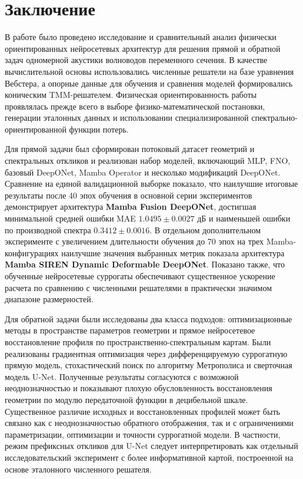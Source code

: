 \chapter*{Заключение}

В работе было проведено исследование и сравнительный анализ физически ориентированных нейросетевых архитектур для решения прямой и обратной задач одномерной акустики волноводов переменного сечения. В качестве вычислительной основы использовались численные решатели на базе уравнения Вебстера, а опорные данные для обучения и сравнения моделей формировались коническим TMM-решателем. Физическая ориентированность работы проявлялась прежде всего в выборе физико-математической постановки, генерации эталонных данных и использовании специализированной спектрально-ориентированной функции потерь.

Для прямой задачи был сформирован потоковый датасет геометрий и спектральных откликов и реализован набор моделей, включающий MLP, FNO, базовый DeepONet, Mamba Operator и несколько модификаций DeepONet. Сравнение на единой валидационной выборке показало, что наилучшие итоговые результаты после 40 эпох обучения в основной серии экспериментов демонстрирует архитектура \textbf{Mamba Fusion DeepONet}, достигшая минимальной средней ошибки MAE $1.0495 \pm 0.0027$ дБ и наименьшей ошибки по производной спектра $0.3412 \pm 0.0016$. В отдельном дополнительном эксперименте с увеличением длительности обучения до 70 эпох на трех Mamba-конфигурациях наилучшие значения выбранных метрик показала архитектура \textbf{Mamba SIREN Dynamic Deformable DeepONet}. Показано также, что обученные нейросетевые суррогаты обеспечивают существенное ускорение расчета по сравнению с численными решателями в практически значимом диапазоне размерностей.

Для обратной задачи были исследованы два класса подходов: оптимизационные методы в пространстве параметров геометрии и прямое нейросетевое восстановление профиля по пространственно-спектральным картам. Были реализованы градиентная оптимизация через дифференцируемую суррогатную прямую модель, стохастический поиск по алгоритму Метрополиса и сверточная модель U-Net. Полученные результаты согласуются с возможной неоднозначностью и показывают плохую обусловленность восстановления геометрии по модулю передаточной функции в децибельной шкале. Существенное различие исходных и восстановленных профилей может быть связано как с неоднозначностью обратного отображения, так и с ограничениями параметризации, оптимизации и точности суррогатной модели. В частности, режим префиксных откликов для U-Net следует интерпретировать как отдельный исследовательский эксперимент с более информативной картой, построенной на основе эталонного численного решателя.

